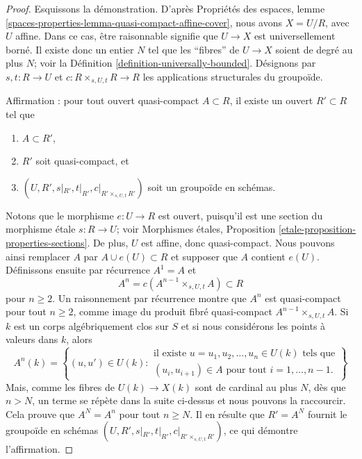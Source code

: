 \begin{proof}
Esquissons la démonstration. D'après
Propriétés des espaces, lemme
\ref{spaces-properties-lemma-quasi-compact-affine-cover},
nous avons $X = U/R$, avec $U$ affine.
Dans ce cas, être raisonnable signifie que $U \to X$ est
universellement borné. Il existe donc un entier $N$ tel que les ``fibres'' de
$U \to X$ soient de degré au plus $N$; voir la
Définition \ref{definition-universally-bounded}.
Désignons par $s, t : R \to U$ et $c : R \times_{s, U, t} R \to R$ les
applications structurales du groupoïde.

\medskip\noindent
Affirmation : pour tout ouvert quasi-compact $A \subset R$, il existe un ouvert
$R' \subset R$ tel que
\begin{enumerate}
\item $A \subset R'$,
\item $R'$ soit quasi-compact, et
\item $(U, R', s|_{R'}, t|_{R'}, c|_{R' \times_{s, U, t} R'})$ soit
un groupoïde en schémas.
\end{enumerate}
Notons que le morphisme $e : U \to R$ est ouvert, puisqu'il est une section du
morphisme étale $s : R \to U$; voir
Morphismes étales, Proposition \ref{etale-proposition-properties-sections}.
De plus, $U$ est affine, donc quasi-compact. Nous pouvons ainsi remplacer $A$
par $A \cup e(U) \subset R$ et supposer que $A$ contient $e(U)$. Définissons
ensuite par récurrence $A^1 = A$ et
$$
A^n = c(A^{n - 1} \times_{s, U, t} A) \subset R
$$
pour $n \geq 2$. Un raisonnement par récurrence montre que $A^n$ est
quasi-compact pour tout $n \geq 2$, comme image du produit fibré quasi-compact
$A^{n - 1} \times_{s, U, t} A$. Si $k$ est un corps algébriquement clos sur
$S$ et si nous considérons les points à valeurs dans $k$, alors
$$
A^n(k) = \left\{(u, u') \in U(k)
:
\begin{matrix}
\text{il existe } u = u_1, u_2, \ldots, u_n \in U(k)
\text{ tels que} \\
(u_i , u_{i + 1}) \in A \text{ pour tout }i = 1, \ldots, n - 1.
\end{matrix}
\right\}
$$
Mais, comme les fibres de $U(k) \to X(k)$ sont de cardinal au plus $N$, dès
que $n > N$, un terme se répète dans la suite ci-dessus et nous pouvons la
raccourcir. Cela prouve que $A^N = A^n$ pour tout $n \geq N$.
Il en résulte que $R' = A^N$ fournit le groupoïde en schémas
$(U, R', s|_{R'}, t|_{R'}, c|_{R' \times_{s, U, t} R'})$, ce qui démontre
l'affirmation.


\end{proof}

